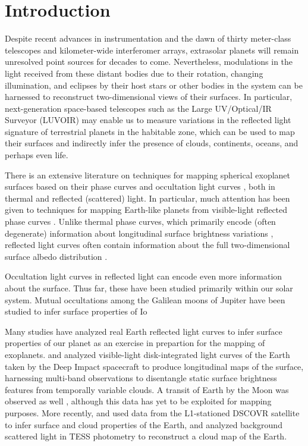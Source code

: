 \documentclass[modern]{aastex62}
\begin{document}
%
\section{Introduction}
\label{sec:intro}
%

Despite recent advances in instrumentation and the dawn of
thirty meter-class telescopes and kilometer-wide interferomer arrays,
extrasolar planets will remain unresolved point sources for decades
to come. Nevertheless, modulations in the light received from these distant
bodies due to their rotation, changing illumination, and eclipses
by their host stars or other bodies in the system can be harnessed to
reconstruct two-dimensional views of their surfaces.
In particular, next-generation space-based telescopes such as the
Large UV/Optical/IR Surveyor (LUVOIR) may enable us to measure
variations in the reflected light signature of terrestrial planets in
the habitable zone, which can be used to map their surfaces and
indirectly infer the presence of clouds, continents, oceans, and perhaps
even life.

There is an extensive literature on techniques for mapping spherical exoplanet surfaces
based on their phase curves
\citep[e.g.,][]{Russell1906,Lacis1972,Knutson2007,Cowan2008,Oakley2009,Berdyugina2017}
and occultation light curves
\citep[e.g.,][]{Williams2006,Rauscher2007,Majeau2012,deWit2012,Rauscher2018},
both in thermal and reflected (scattered) light.
In particular, much attention has been given to techniques for mapping
Earth-like planets from visible-light reflected phase curves
\citep[e.g.,][]{Ford2001,Kawahara2010,Kawahara2011,Fujii2012,Kawahara2020,Aizawa2020}.
Unlike thermal phase curves, which primarily encode (often degenerate)
information about longitudinal surface brightness variations
\citep{Russell1906}, reflected light curves often contain information
about the full two-dimensional surface albedo distribution
\citep[e.g.,][]{Kawahara2010}.

Occultation light curves in reflected light can encode even more information
about the surface. Thus far, these have been studied primarily within our
solar system. Mutual occultations among the Galilean moons of Jupiter
have been studied to infer surface properties of Io

Many studies have analyzed real Earth reflected light curves to
infer surface properties of our planet as an exercise in
prepartion for the mapping of exoplanets.
%
\citet{Cowan2009} and \citet{Cowan2011b} analyzed visible-light disk-integrated light curves
of the Earth taken by the Deep Impact spacecraft to produce
longitudinal maps of the surface, harnessing multi-band observations
to disentangle static surface brightness features from temporally
variable clouds.  A transit of Earth by the Moon was observed
as well \citep{Livengood2011}, although this data has yet to be
exploited for mapping purposes.
More recently, \citet{Jiang2018} and \citet{Fan2019}
used data from the L1-stationed DSCOVR satellite to infer surface
and cloud properties of the Earth, and \citet{Luger2019b} analyzed
background scattered light in TESS photometry to reconstruct a cloud
map of the Earth.
\end{document}
